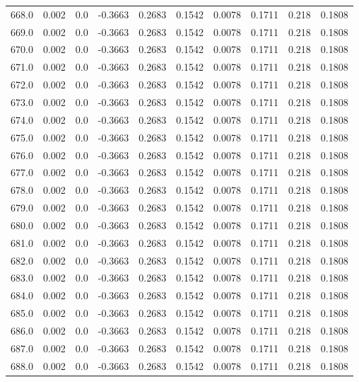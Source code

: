 \begin{longtable}{lrrrrrrrrr}
668.0 & 0.002 & 0.0 & -0.3663 & 0.2683 & 0.1542 & 0.0078 & 0.1711 & 0.218 & 0.1808 \\
669.0 & 0.002 & 0.0 & -0.3663 & 0.2683 & 0.1542 & 0.0078 & 0.1711 & 0.218 & 0.1808 \\
670.0 & 0.002 & 0.0 & -0.3663 & 0.2683 & 0.1542 & 0.0078 & 0.1711 & 0.218 & 0.1808 \\
671.0 & 0.002 & 0.0 & -0.3663 & 0.2683 & 0.1542 & 0.0078 & 0.1711 & 0.218 & 0.1808 \\
672.0 & 0.002 & 0.0 & -0.3663 & 0.2683 & 0.1542 & 0.0078 & 0.1711 & 0.218 & 0.1808 \\
673.0 & 0.002 & 0.0 & -0.3663 & 0.2683 & 0.1542 & 0.0078 & 0.1711 & 0.218 & 0.1808 \\
674.0 & 0.002 & 0.0 & -0.3663 & 0.2683 & 0.1542 & 0.0078 & 0.1711 & 0.218 & 0.1808 \\
675.0 & 0.002 & 0.0 & -0.3663 & 0.2683 & 0.1542 & 0.0078 & 0.1711 & 0.218 & 0.1808 \\
676.0 & 0.002 & 0.0 & -0.3663 & 0.2683 & 0.1542 & 0.0078 & 0.1711 & 0.218 & 0.1808 \\
677.0 & 0.002 & 0.0 & -0.3663 & 0.2683 & 0.1542 & 0.0078 & 0.1711 & 0.218 & 0.1808 \\
678.0 & 0.002 & 0.0 & -0.3663 & 0.2683 & 0.1542 & 0.0078 & 0.1711 & 0.218 & 0.1808 \\
679.0 & 0.002 & 0.0 & -0.3663 & 0.2683 & 0.1542 & 0.0078 & 0.1711 & 0.218 & 0.1808 \\
680.0 & 0.002 & 0.0 & -0.3663 & 0.2683 & 0.1542 & 0.0078 & 0.1711 & 0.218 & 0.1808 \\
681.0 & 0.002 & 0.0 & -0.3663 & 0.2683 & 0.1542 & 0.0078 & 0.1711 & 0.218 & 0.1808 \\
682.0 & 0.002 & 0.0 & -0.3663 & 0.2683 & 0.1542 & 0.0078 & 0.1711 & 0.218 & 0.1808 \\
683.0 & 0.002 & 0.0 & -0.3663 & 0.2683 & 0.1542 & 0.0078 & 0.1711 & 0.218 & 0.1808 \\
684.0 & 0.002 & 0.0 & -0.3663 & 0.2683 & 0.1542 & 0.0078 & 0.1711 & 0.218 & 0.1808 \\
685.0 & 0.002 & 0.0 & -0.3663 & 0.2683 & 0.1542 & 0.0078 & 0.1711 & 0.218 & 0.1808 \\
686.0 & 0.002 & 0.0 & -0.3663 & 0.2683 & 0.1542 & 0.0078 & 0.1711 & 0.218 & 0.1808 \\
687.0 & 0.002 & 0.0 & -0.3663 & 0.2683 & 0.1542 & 0.0078 & 0.1711 & 0.218 & 0.1808 \\
688.0 & 0.002 & 0.0 & -0.3663 & 0.2683 & 0.1542 & 0.0078 & 0.1711 & 0.218 & 0.1808 \\

\end{longtable}

